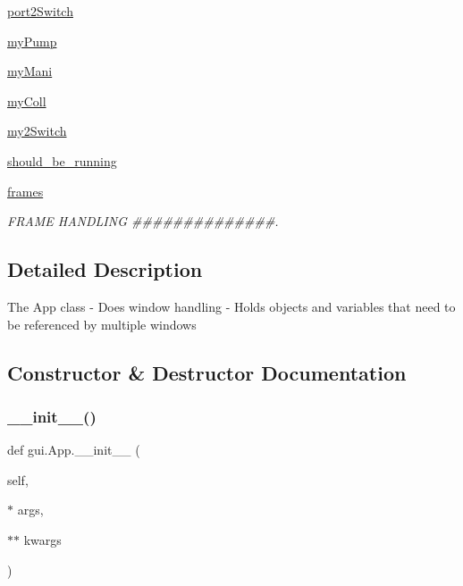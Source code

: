 \begin{DoxyCompactItemize}
\item 
\mbox{\hyperlink{classgui_1_1_app_a82da4048722544098fb7de8e9a66678e}{port2\+Switch}}
\item 
\mbox{\hyperlink{classgui_1_1_app_ac0934a9dd579fa5ec8ec26a51001dda1}{my\+Pump}}
\item 
\mbox{\hyperlink{classgui_1_1_app_ad7fd30d2548b03cb350b853276548353}{my\+Mani}}
\item 
\mbox{\hyperlink{classgui_1_1_app_a4f98f6cb0da9c5fab12024cdb220cba7}{my\+Coll}}
\item 
\mbox{\hyperlink{classgui_1_1_app_aab7c53e3cf83310b55cf738af03add2f}{my2\+Switch}}
\item 
\mbox{\hyperlink{classgui_1_1_app_a3e9aa3d2822e93efab920385513ef9e6}{should\+\_\+be\+\_\+running}}
\item 
\mbox{\hyperlink{classgui_1_1_app_ac51ff9d8a930644ef1dd9ac7651b5c00}{frames}}
\begin{DoxyCompactList}\small\item\em F\+R\+A\+ME H\+A\+N\+D\+L\+I\+NG \#\#\#\#\#\#\#\#\#\#\#\#\#\#. \end{DoxyCompactList}\end{DoxyCompactItemize}


\subsection{Detailed Description}
\begin{DoxyVerb}The App class
- Does window handling
- Holds objects and variables that need to be referenced by multiple windows
\end{DoxyVerb}
 

\subsection{Constructor \& Destructor Documentation}
\mbox{\label{classgui_1_1_app_a06104bbd30a404f6dcd22b9ceba6c9a5}} 
\subsubsection{\texorpdfstring{\_\_init\_\_()}{\_\_init\_\_()}}
{\footnotesize\ttfamily def gui.\+App.\+\_\+\+\_\+init\+\_\+\+\_\+ (\begin{DoxyParamCaption}\item[{}]{self,  }\item[{$\ast$}]{args,  }\item[{$\ast$$\ast$}]{kwargs }\end{DoxyParamCaption})}

